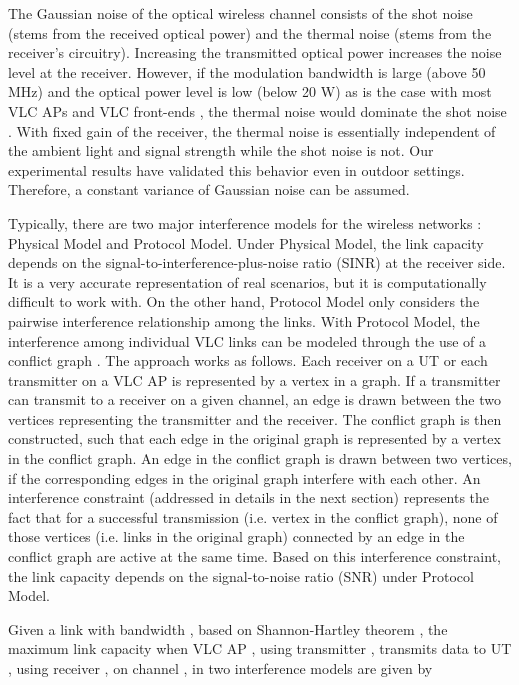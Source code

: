 \documentclass[10pt,journal]{IEEEtran}
\begin{document}
The Gaussian noise of the optical wireless channel consists of the shot noise (stems from the received optical power) and the thermal noise (stems from the receiver's circuitry). Increasing the transmitted optical power increases the noise level at the receiver. However, if the modulation bandwidth is large (above 50 MHz) and the optical power level is low (below 20 W) as is the case with most VLC APs and VLC front-ends \cite{langer2013optoelectronics}, the thermal noise would dominate the shot noise \cite{komine2004fundamental}. With fixed gain of the receiver, the thermal noise is essentially independent of the ambient light and signal strength while the shot noise is not. Our experimental results \cite{shao2015analysis,shao2015design} have validated this behavior even in outdoor settings. Therefore, a constant variance of Gaussian noise can be assumed.

Typically, there are two major interference models for the wireless networks \cite{gupta2000capacity}: Physical Model and Protocol Model. Under Physical Model, the link capacity depends on the signal-to-interference-plus-noise ratio (SINR) at the receiver side. It is a very accurate representation of real scenarios, but it is computationally difficult to work with. On the other hand, Protocol Model only considers the pairwise interference relationship among the links. With Protocol Model, the interference among individual VLC links can be modeled through the use of a conflict graph \cite{diestel2005graph}. The approach works as follows. Each receiver on a UT or each transmitter on a VLC AP is represented by a vertex in a graph. If a transmitter can transmit to a receiver on a given channel, an edge is drawn between the two vertices representing the transmitter and the receiver. The conflict graph is then constructed, such that each edge in the original graph is represented by a vertex in the conflict graph. An edge in the conflict graph is drawn between two vertices, if the corresponding edges in the original graph interfere with each other. An interference constraint (addressed in details in the next section) represents the fact that for a successful transmission (i.e. vertex in the conflict graph), none of those vertices (i.e. links in the original graph) connected by an edge in the conflict graph are active at the same time. Based on this interference constraint, the link capacity depends on the signal-to-noise ratio (SNR) under Protocol Model.


Given a link with bandwidth , based on Shannon-Hartley theorem \cite{cover2012elements}, the maximum link capacity  when VLC AP , using transmitter , transmits data to UT , using receiver , on channel , in two interference models are given \cite{stefan2014hybrid} by
\end{document}
